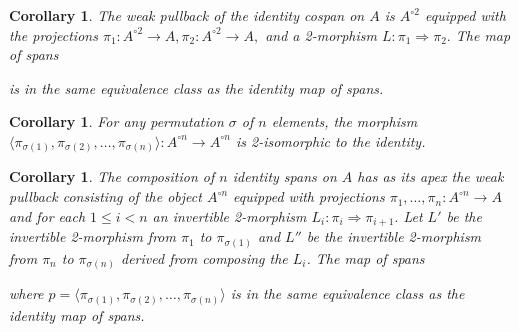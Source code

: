 \documentclass[12pt,twoside,openright]{report}
\newcommand{\maps}{\colon}
\newtheorem{cor}[thm]{Corollary}
\begin{document}
\begin{cor}
  The weak pullback of the identity cospan on $A$ is $A^{\circ 2}$ equipped with the projections $\pi_1\maps A^{\circ 2}\to A, \pi_2\maps A^{\circ 2}\to A,$ and a 2-morphism $L\maps \pi_1\Rightarrow \pi_2.$  The map of spans
  \begin{center}
  \end{center}
  is in the same equivalence class as the identity map of spans.
\end{cor}

\begin{cor}
  For any permutation $\sigma$ of $n$ elements, the morphism $\langle \pi_{\sigma(1)}, \pi_{\sigma(2)}, \ldots, \pi_{\sigma(n)}\rangle\maps A^{\circ n} \to A^{\circ n}$ is 2-isomorphic to the identity.
\end{cor}

\begin{cor}
  \label{permute}
  The composition of $n$ identity spans on $A$ has as its apex the weak pullback consisting of the object $A^{\circ n}$ equipped with projections $\pi_1, \ldots, \pi_n\maps A^{\circ n} \to A$ and for each $1 \le i < n$ an invertible 2-morphism $L_i\maps \pi_i \Rightarrow \pi_{i+1}.$  Let $L'$ be the invertible 2-morphism from $\pi_1$ to $\pi_{\sigma(1)}$ and $L''$ be the invertible 2-morphism from $\pi_n$ to $\pi_{\sigma(n)}$ derived from composing the $L_i$.  The map of spans 
  \begin{center}
  \end{center}
  where $p = \langle \pi_{\sigma(1)}, \pi_{\sigma(2)}, \ldots, \pi_{\sigma(n)}\rangle$ is in the same equivalence class as the identity map of spans.
\end{cor}  
\end{document}
